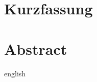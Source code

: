 \thispagestyle{plain}

\section*{Kurzfassung}


\section*{Abstract}
\begin{foreignlanguage}{english}

\end{foreignlanguage}
